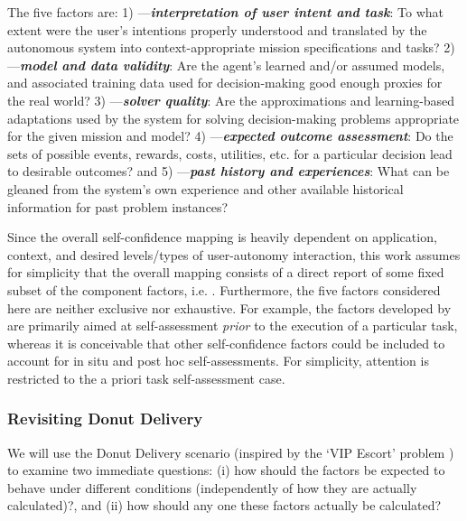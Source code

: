     The five factors are: 1) \xI---\textit{\textbf{interpretation of user intent and task}}: To what extent were the user's intentions properly understood and translated by the autonomous system into context-appropriate mission specifications and tasks?  2) \xM---\textit{\textbf{model and data validity}}: Are the agent's learned and/or assumed models, and associated training data used for decision-making good enough proxies for the real world? 3) \xQ---\textit{\textbf{solver quality}}: Are the approximations and learning-based adaptations used by the system for solving decision-making problems appropriate for the given mission and model? 4) \xO---\textit{\textbf{expected outcome assessment}}: Do the sets of possible events, rewards, costs, utilities, etc. for a particular decision lead to desirable outcomes? and 5) \xP---\textit{\textbf{past history and experiences}}: What can be gleaned from the system's own experience and other available historical information for past problem instances?  

    Since the overall self-confidence mapping is heavily dependent on application, context, and desired levels/types of user-autonomy interaction, this work assumes for simplicity that the overall mapping consists of a direct report of some fixed subset of the component factors, i.e. \xSC. 
    Furthermore, the five factors considered here are neither exclusive nor exhaustive. For example, the factors developed by \cite{Aitken2016-cv,Aitken2016-fb} are primarily aimed at self-assessment \emph{prior} to the execution of a particular task, whereas it is conceivable that other self-confidence factors could be included to account for in situ and post hoc self-assessments. For simplicity, attention is restricted to the a priori task self-assessment case. 

\subsubsection{Revisiting Donut Delivery}
We will use the Donut Delivery scenario (inspired by the `VIP Escort' problem \cite{Humphrey2012-lr}) to examine two immediate questions: (i) how should the factors be expected to behave under different conditions (independently of how they are actually calculated)?, and (ii) how should any one these factors actually be calculated?

